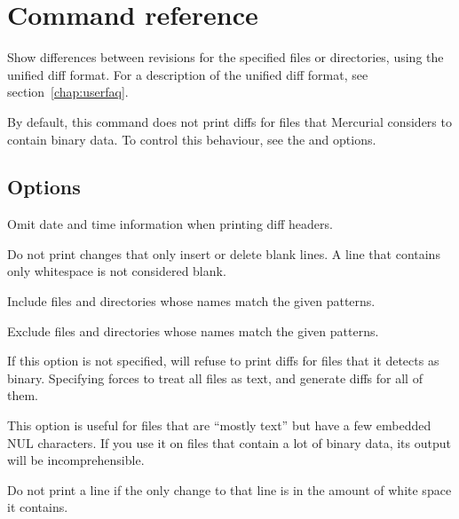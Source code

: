 \chapter{Command reference}
\label{cmdref}



Show differences between revisions for the specified files or
directories, using the unified diff format.  For a description of the
unified diff format, see section~\ref{chap:userfaq}.

By default, this command does not print diffs for files that Mercurial
considers to contain binary data.  To control this behaviour, see the
 and  options.

\section{Options}


Omit date and time information when printing diff headers.


Do not print changes that only insert or delete blank lines.  A line
that contains only whitespace is not considered blank.


Include files and directories whose names match the given patterns.


Exclude files and directories whose names match the given patterns.


If this option is not specified,  will refuse to print
diffs for files that it detects as binary. Specifying 
forces  to treat all files as text, and generate diffs for
all of them.

This option is useful for files that are ``mostly text'' but have a
few embedded NUL characters.  If you use it on files that contain a
lot of binary data, its output will be incomprehensible.


Do not print a line if the only change to that line is in the amount
of white space it contains.

